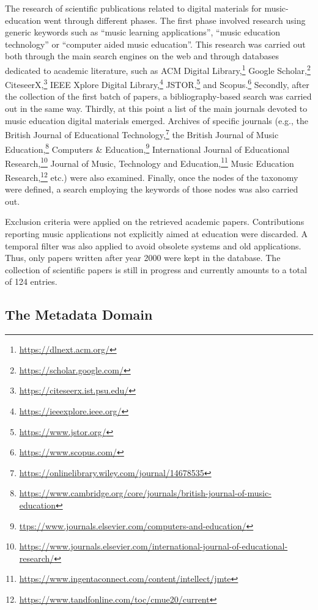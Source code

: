 \documentclass[journal]{IEEEtran}
\begin{document}
The research of scientific publications related to digital materials for music-education went through different phases. The first phase involved research using generic keywords such as ``music learning applications'', ``music education technology'' or ``computer aided music education''. This research was carried out both through the main search engines on the web and through databases dedicated to academic literature, such as ACM Digital Library,\footnote{\url{https://dlnext.acm.org/}} Google Scholar,\footnote{\url{https://scholar.google.com/}} CiteseerX,\footnote{\url{https://citeseerx.ist.psu.edu/}} IEEE Xplore Digital Library,\footnote{\url{https://ieeexplore.ieee.org/}} JSTOR,\footnote{\url{https://www.jstor.org/}} and Scopus.\footnote{\url{https://www.scopus.com/}} Secondly, after the collection of the first batch of papers, a bibliography-based search was carried out in the same way. Thirdly, at this point a list of the main journals devoted to music education digital materials emerged. Archives of specific journals (e.g., the British Journal of Educational Technology,\footnote{\url{https://onlinelibrary.wiley.com/journal/14678535}} the British Journal of Music Education,\footnote{\url{https://www.cambridge.org/core/journals/british-journal-of-music-education}} Computers \& Education,\footnote{\url{ttps://www.journals.elsevier.com/computers-and-education/}} International Journal of Educational Research,\footnote{\url{https://www.journals.elsevier.com/international-journal-of-educational-research/}} Journal of Music, Technology and Education,\footnote{\url{https://www.ingentaconnect.com/content/intellect/jmte}} Music Education Research,\footnote{\url{https://www.tandfonline.com/toc/cmue20/current}} etc.) were also examined. Finally, once the nodes of the taxonomy were defined, a search employing the keywords of those nodes was also carried out.



Exclusion criteria were applied on the retrieved academic papers. Contributions reporting music applications not explicitly aimed at education were discarded. A temporal filter was also applied to avoid obsolete systems and old applications. Thus, only papers written after year 2000 were kept in the database.
The collection of scientific papers is still in progress and currently amounts to a total of 124 entries.

\subsection{The Metadata Domain}
\label{subsec:MeD}
\end{document}
